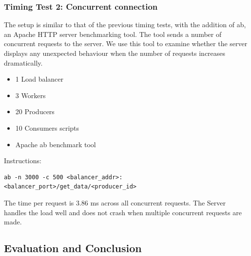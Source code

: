 \documentclass{sigchi}
\begin{document}
\subsubsection{Timing Test 2: Concurrent connection}

The setup is similar to that of the previous timing tests, with the addition of ab, an Apache HTTP server benchmarking tool. The tool sends a number of concurrent requests to the server. We use this tool to examine whether the server displays any unexpected behaviour when the number of requests increases dramatically.

\begin{itemize}
  \item 1 Load balancer
  \item 3 Workers
  \item 20 Producers
  \item 10 Consumers scripts
  \item Apache ab benchmark tool
\end{itemize}

Instructions:

\vspace*{\baselineskip}
\begin{lstlisting}[caption={Apache ab testing: instruction}, mathescape, upquote=true]
  ab -n 3000 -c 500 <balancer_addr>:<balancer_port>/get_data/<producer_id>
\end{lstlisting}

The time per request is 3.86 ms across all concurrent requests. The Server handles the load well and does not crash when multiple concurrent requests are made.

\subsection{Evaluation and Conclusion}
\end{document}
